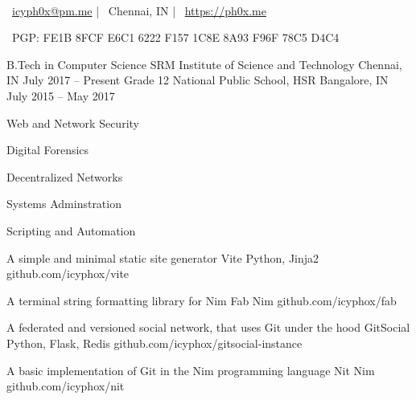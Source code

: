\documentclass[]{awesome-cv}
\begin{document}
    
\begin{center}
	  \\
	\vspace{2mm}
	{\faEnvelope\ \href{mailto:icyph0x@pm.me}{icyph0x@pm.me}} | {\faMapMarker\ Chennai, IN} | {\faLink\ \url{https://ph0x.me}}
	\begin{center}
		{\faKey\ PGP: FE1B 8FCF E6C1 6222 F157 1C8E 8A93 F96F 78C5 D4C4}
	\end{center} 
\end{center} 


\begin{cventries}
	\cventry
	{B.Tech in Computer Science}
	{SRM Institute of Science and Technology}
	{Chennai, IN}
	{July 2017 – Present}
	{}
	\cventry
	{Grade 12}
	{National Public School, HSR}
	{Bangalore, IN}
	{July 2015 – May 2017}
	{}
\end{cventries}


\vspace{-6mm}
\vspace{3mm}
	{\begin{cvitems}
		\item {Web and Network Security}
		\item {Digital Forensics}
		\item {Decentralized Networks}
		\item {Systems Adminstration}
		\item {Scripting and Automation}
	\end{cvitems}}


\begin{cventries}
	\cventry
	{A simple and minimal static site generator}
	{Vite}
	{Python, Jinja2}
	{github.com/icyphox/vite}
	{}
	
	\vspace{-5mm}
	\cventry
	{A terminal string formatting library for Nim}
	{Fab}
	{Nim}
	{github.com/icyphox/fab}
	{}

	\vspace{-5mm}
	\cventry
	{A federated and versioned social network, that uses Git under the hood}
	{GitSocial}
	{Python, Flask, Redis}
	{github.com/icyphox/gitsocial-instance}
	{}

	\vspace{-5mm}
	\cventry
	{A basic implementation of Git in the Nim programming language}  
	{Nit}
	{Nim}
	{github.com/icyphox/nit}
	{}
	
	\vspace{-5mm}

\end{cventries}
\end{document}
